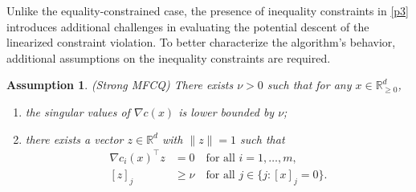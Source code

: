 \documentclass[11pt]{article}
\newtheorem{assumption}{Assumption}
\newcommand{\R}{\mathbb{R}}
\newcommand{\argmin}{\mathop{\mathrm{arg\,min}}}
\newcommand{\be}{\begin{equation}}
\newcommand{\ee}{\end{equation}}
\begin{document}
Unlike the equality-constrained case, the presence of inequality constraints in \eqref{p3} introduces additional challenges in evaluating the potential descent of the linearized constraint violation. %
To better characterize the algorithm's behavior,  additional assumptions on the inequality constraints are required. %
\begin{assumption}\label{ass:mfcq}
    {\rm (Strong MFCQ)} 
    There exists $\nu>0$ such that for any {$x \in \R_{\ge0}^d$}, %
    \begin{enumerate}
    \item[(i)] the singular values of $\nabla c(x)$ is lower bounded by $\nu$;
    \item[(ii)] there exists a vector \(z \in \R^d\) with \(\|z\|=1\) such that
    \begin{align*}
    \nabla c_i(x)^\top z & = 0 \quad \text{for all } i = 1, \ldots, m,\\
    [z]_j & \ge \nu \quad \text{for all } j \in \{ j : [x]_j = 0 \}.
    \end{align*}
\end{enumerate}
\end{assumption}
\end{document}
